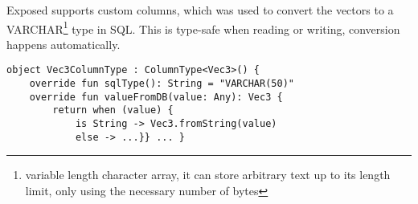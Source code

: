 \label{serialise}
Exposed supports custom columns, which was used to convert the vectors to a VARCHAR\footnote{variable length character array, it can store arbitrary text up to its length limit, only using the necessary number of bytes} type in SQL. This is type-safe when reading or writing, conversion happens automatically.
\begin{lstlisting}[caption=Custom column type in JetBrains Exposed]
    object Vec3ColumnType : ColumnType<Vec3>() {
    override fun sqlType(): String = "VARCHAR(50)"
    override fun valueFromDB(value: Any): Vec3 {
        return when (value) {
            is String -> Vec3.fromString(value)
            else -> ...}} ... }
\end{lstlisting}